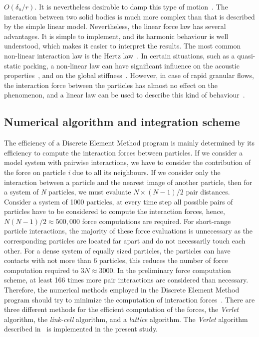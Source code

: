 $\mathbf{\mathit{O}}(\delta_{n}/r)$. It is nevertheless desirable to damp this 
type of 
motion~\citep{Radjai2011}. 
The interaction between two solid bodies is much more complex than that is 
described by the simple 
linear model. Nevertheless, the linear force law has several advantages. It is 
simple to 
implement, 
and its harmonic behaviour is well understood, which makes it easier to 
interpret the results. The 
most common non-linear interaction law is the Hertz law~\citep{Hertz1882}. In 
certain situations, 
such as a quasi-static packing, a non-linear law can have significant influence 
on the acoustic 
properties~\citep{Tou2004}, and on the global stiffness~\citep{Agn2007}. 
However, in case of rapid 
granular flows, the interaction force between the particles has almost no 
effect on the 
phenomenon, 
and a linear law can be used to describe this kind of 
behaviour~\citep{Radjai2011}. 
% 
%
\subsection{Numerical algorithm and integration scheme}
The efficiency of a Discrete Element Method program is mainly determined by 
its efficiency to compute the interaction forces between particles. If we 
consider a model system with pairwise interactions, we have to consider the 
contribution of the force on particle \textit{i} due to all its 
neighbours. If we consider only the interaction between a particle and the 
nearest image of another particle, then for a system of \textit{N} particles, 
we must evaluate $N \times (N-1)/2$ pair distances. Consider a system of 1000 
particles, at every time step all possible pairs of particles have to be 
considered to compute the interaction forces, hence, 
$\mathit{N}(\mathit{N}-1)/2 \approx 500,000$ 
force computations are required. For short-range particle interactions, the 
majority of these force evaluations is unnecessary as the corresponding 
particles are located far apart and do not necessarily touch each other. For a 
dense system of equally sized particles, the particles can have 
contacts with not more than 6 particles, this reduces the number of force 
computation required to $3\mathit{N} \approx 3000$. In the preliminary force 
computation scheme, at least 166 times more pair interactions are considered 
than necessary. Therefore, the numerical methods employed in the 
Discrete Element Method program should try to minimize the computation of 
interaction forces~\citep{Posch2005}. There are three different methods for the 
efficient computation of the forces, the \textit{Verlet} algorithm, the 
\textit{link-cell} algorithm, and a \textit{lattice} algorithm. The 
\textit{Verlet} algorithm described in~\citet{Grubmuller1991} 
is implemented in the 
present study.
\clearpage
